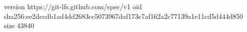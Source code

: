 version https://git-lfs.github.com/spec/v1
oid sha256:ee2dccdb1ad4dd2683cc5073967daf173c7af162a2c77139a1e11cd5d444d850
size 43840

